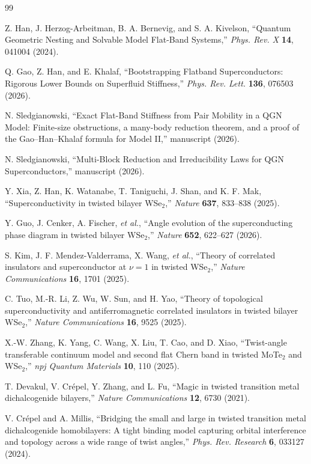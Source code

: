 \documentclass[11pt]{article}
\theoremstyle{remark}
\begin{document}
\begin{thebibliography}{99}

Z. Han, J. Herzog-Arbeitman, B. A. Bernevig, and S. A. Kivelson,
``Quantum Geometric Nesting and Solvable Model Flat-Band Systems,''
\emph{Phys. Rev. X} \textbf{14}, 041004 (2024).

Q. Gao, Z. Han, and E. Khalaf,
``Bootstrapping Flatband Superconductors: Rigorous Lower Bounds on Superfluid Stiffness,''
\emph{Phys. Rev. Lett.} \textbf{136}, 076503 (2026).

N. Sledgianowski,
``Exact Flat-Band Stiffness from Pair Mobility in a QGN Model: Finite-size obstructions, a many-body reduction theorem, and a proof of the Gao--Han--Khalaf formula for Model II,'' manuscript (2026).

N. Sledgianowski,
``Multi-Block Reduction and Irreducibility Laws for QGN Superconductors,'' manuscript (2026).

Y. Xia, Z. Han, K. Watanabe, T. Taniguchi, J. Shan, and K. F. Mak,
``Superconductivity in twisted bilayer WSe$_2$,''
\emph{Nature} \textbf{637}, 833--838 (2025).

Y. Guo, J. Cenker, A. Fischer, \emph{et al.},
``Angle evolution of the superconducting phase diagram in twisted bilayer WSe$_2$,''
\emph{Nature} \textbf{652}, 622--627 (2026).

S. Kim, J. F. Mendez-Valderrama, X. Wang, \emph{et al.},
``Theory of correlated insulators and superconductor at $\nu=1$ in twisted WSe$_2$,''
\emph{Nature Communications} \textbf{16}, 1701 (2025).

C. Tuo, M.-R. Li, Z. Wu, W. Sun, and H. Yao,
``Theory of topological superconductivity and antiferromagnetic correlated insulators in twisted bilayer WSe$_2$,''
\emph{Nature Communications} \textbf{16}, 9525 (2025).

X.-W. Zhang, K. Yang, C. Wang, X. Liu, T. Cao, and D. Xiao,
``Twist-angle transferable continuum model and second flat Chern band in twisted MoTe$_2$ and WSe$_2$,''
\emph{npj Quantum Materials} \textbf{10}, 110 (2025).

T. Devakul, V. Cr\'epel, Y. Zhang, and L. Fu,
``Magic in twisted transition metal dichalcogenide bilayers,''
\emph{Nature Communications} \textbf{12}, 6730 (2021).

V. Cr\'epel and A. Millis,
``Bridging the small and large in twisted transition metal dichalcogenide homobilayers: A tight binding model capturing orbital interference and topology across a wide range of twist angles,''
\emph{Phys. Rev. Research} \textbf{6}, 033127 (2024).


\end{thebibliography}
\end{document}
